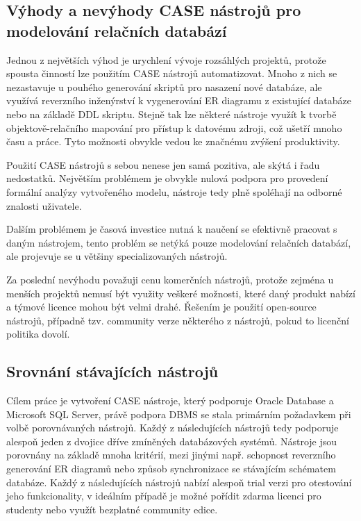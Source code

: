 \documentclass[czech,bachelor,public,dept460,male,oneside]{diploma}
\begin{document}
	\subsection{Výhody a nevýhody CASE nástrojů pro modelování relačních databází}
	Jednou z největších výhod je urychlení vývoje rozsáhlých projektů, protože spousta činností lze použitím CASE nástrojů automatizovat. Mnoho z nich se nezastavuje u pouhého generování skriptů pro nasazení nové databáze, ale využívá reverzního inženýrství k vygenerování ER diagramu z existující databáze nebo na základě DDL skriptu. Stejně tak lze některé nástroje využít k tvorbě objektově-relačního mapování pro přístup k datovému zdroji, což ušetří mnoho času a práce. Tyto možnosti obvykle vedou ke značnému zvýšení produktivity.
	
	Použití CASE nástrojů s sebou nenese jen samá pozitiva, ale skýtá i řadu nedostatků. Největším problémem je obvykle nulová podpora pro provedení formální analýzy vytvořeného modelu, nástroje tedy plně spoléhají na odborné znalosti uživatele. 
	
	Dalším problémem je časová investice nutná k naučení se efektivně pracovat s daným nástrojem, tento problém se netýká pouze modelování relačních databází, ale projevuje se u většiny specializovaných nástrojů. 
	
	Za poslední nevýhodu považuji cenu komerčních nástrojů, protože zejména u menších projektů nemusí být využity veškeré možnosti, které daný produkt nabízí a týmové licence mohou být velmi drahé. Řešením je použití open-source nástrojů, případně tzv. community verze některého z nástrojů, pokud to licenční politika dovolí.
	
	\subsection{Srovnání stávajících nástrojů}
	Cílem práce je vytvoření CASE nástroje, který podporuje Oracle Database a Microsoft SQL Server, právě podpora DBMS se stala primárním požadavkem při volbě porovnávaných nástrojů. Každý z následujících nástrojů tedy podporuje alespoň jeden z dvojice dříve zmíněných databázových systémů. Nástroje jsou porovnány na základě mnoha kritérií, mezi jinými např. schopnost reverzního generování ER diagramů nebo způsob synchronizace se stávajícím schématem databáze. Každý z následujících nástrojů nabízí alespoň trial verzi pro otestování jeho funkcionality, v ideálním případě je možné pořídit zdarma licenci pro studenty nebo využít bezplatné community edice. 
	
\end{document}
